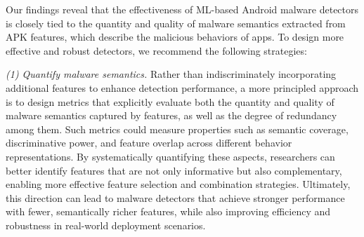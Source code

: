 
Our findings reveal that the effectiveness of ML-based Android malware detectors is closely tied to the quantity and quality of malware semantics extracted from APK features, which describe the malicious behaviors of apps.
To design more effective and robust detectors, we recommend the following strategies:

\noindent \textit{(1) Quantify malware semantics.}
Rather than indiscriminately incorporating additional features to enhance detection performance, a more principled approach is to design metrics that explicitly evaluate both the quantity and quality of malware semantics captured by features, as well as the degree of redundancy among them.
Such metrics could measure properties such as semantic coverage, discriminative power, and feature overlap across different behavior representations.
By systematically quantifying these aspects, researchers can better identify features that are not only informative but also complementary, enabling more effective feature selection and combination strategies. 
Ultimately, this direction can lead to malware detectors that achieve stronger performance with fewer, semantically richer features, while also improving efficiency and robustness in real-world deployment scenarios.

